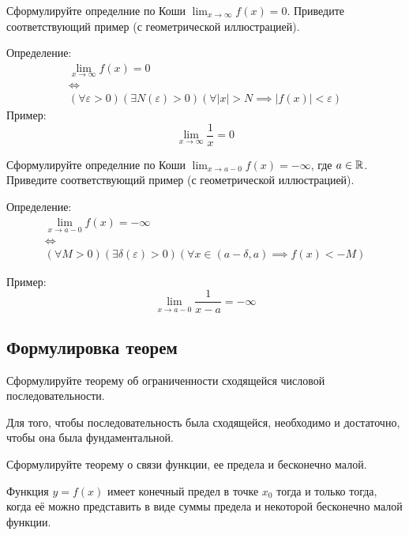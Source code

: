 \begin{question}
  Сформулируйте определние по Коши $\lim_{x \to \infty} f(x) = 0$.
Приведите соответствующий пример (с геометрической иллюстрацией).
\end{question}
\begin{answer}
  Определение:
  \begin{gather*}
    \lim_{x \to \infty} f(x) = 0 \\
    \iff \\
    (\forall \varepsilon > 0)(\exists N(\varepsilon) > 0)(\forall |x| > N \implies |f(x)| < \varepsilon)
  \end{gather*}
  Пример: \[
    \lim_{x \to \infty} \frac{1}{x} = 0
  \] 
\end{answer}
  
\begin{question}
  Сформулируйте определние по Коши $\lim_{x \to a-0} f(x) = -\infty$, где $a \in \mathbb{R}$.
Приведите соответствующий пример (с геометрической иллюстрацией).
\end{question}
\begin{answer}
  Определение:
  \begin{gather*}
    \lim_{x \to a - 0} f(x) = -\infty \\
    \iff \\
    (\forall M > 0)(\exists \delta(\varepsilon) > 0)(\forall x \in (a - \delta, a) \implies f(x) < -M)
  \end{gather*}

  Пример: \[
    \lim_{x \to a - 0} \frac{1}{x - a} = -\infty
  \] 
\end{answer}


\subsection{Формулировка теорем}

\begin{question}
  Сформулируйте теорему об ограниченности сходящейся числовой последовательности.
\end{question}
\begin{answer}
  Для того, чтобы последовательность была сходящейся, необходимо и достаточно, чтобы она была фундаментальной.
\end{answer}

\begin{question}
  Сформулируйте теорему о связи функции, ее предела и бесконечно малой.  
\end{question}
\begin{answer}
  Функция $y = f(x)$ имеет конечный предел в точке  $x_0$ тогда и только тогда, когда её можно представить в виде суммы предела и некоторой бесконечно малой функции.
\end{answer}

